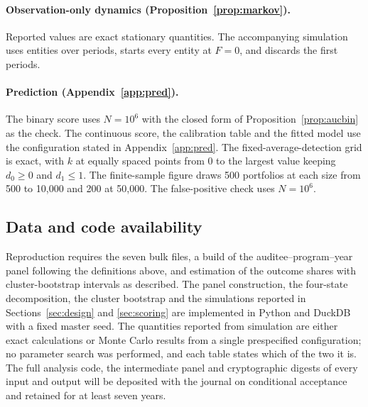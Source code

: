 \paragraph{Observation-only dynamics (Proposition~\ref{prop:markov}).}
Reported values are exact stationary quantities. The accompanying simulation
uses \nObsOnlyN{} entities over \nObsOnlyT{} periods, starts every entity at
$F = 0$, and discards the first \nObsOnlyBurn{} periods.

\paragraph{Prediction (Appendix~\ref{app:pred}).} The binary score uses $N =
10^6$ with the closed form of Proposition~\ref{prop:aucbin} as the check. The
continuous score, the calibration table and the fitted model use the
configuration stated in Appendix~\ref{app:pred}. The fixed-average-detection
grid is exact, with $k$ at \nBudgetPoints{} equally spaced points from 0 to
the largest value keeping $d_0 \ge 0$ and $d_1 \le 1$. The finite-sample
figure draws 500 portfolios at each size from 500 to 10,000 and 200 at
50,000. The false-positive check uses $N = 10^6$.

\subsection{Data and code availability}

Reproduction requires the seven bulk files, a build of the
auditee--program--year panel following the definitions above, and estimation
of the outcome shares with cluster-bootstrap intervals as described. The panel
construction, the four-state decomposition, the cluster bootstrap and the
simulations reported in Sections~\ref{sec:design} and \ref{sec:scoring} are
implemented in Python and DuckDB with a fixed master seed. The quantities
reported from simulation are either exact calculations or Monte Carlo results
from a single prespecified configuration; no parameter search was performed,
and each table states which of the two it is. The full analysis code, the
intermediate panel and cryptographic digests of every input and output will be
deposited with the journal on conditional acceptance and retained for at least
seven years.




